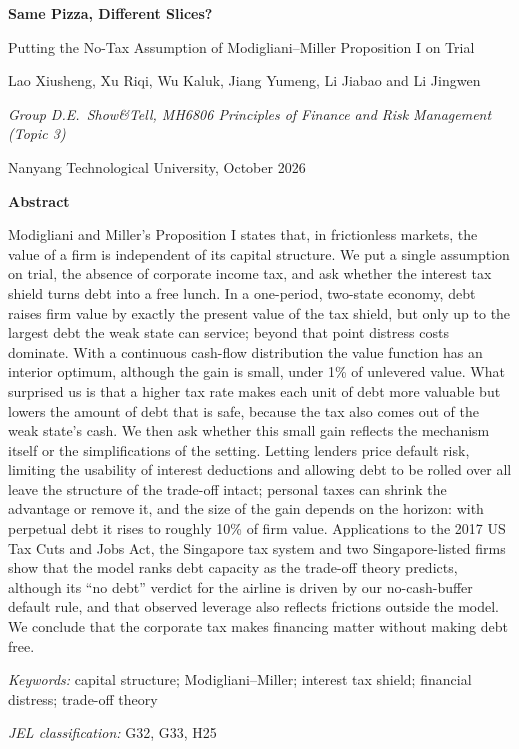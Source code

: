 \begin{center}
{\LARGE\bfseries Same Pizza, Different Slices?\par}
\vspace{4pt}
{\large Putting the No-Tax Assumption of Modigliani--Miller Proposition I on Trial\par}
\vspace{10pt}
{\normalsize Lao Xiusheng, Xu Riqi, Wu Kaluk, Jiang Yumeng, Li Jiabao and Li Jingwen\par}
\vspace{2pt}
{\small\itshape Group D.E.\ Show\&Tell, MH6806 Principles of Finance and Risk Management (Topic 3)\par
Nanyang Technological University, October 2026\par}
\end{center}
\vspace{4pt}
\begin{center}\textbf{Abstract}\end{center}
\vspace{-6pt}
\begin{list}{}{\leftmargin=1cm\rightmargin=1cm\itemindent=0pt\listparindent=0pt\topsep=0pt\parsep=0pt}\item[]\small
Modigliani and Miller's Proposition I states that, in frictionless markets, the value of a firm is independent of its capital structure. We put a single assumption on trial, the absence of corporate income tax, and ask whether the interest tax shield turns debt into a free lunch. In a one-period, two-state economy, debt raises firm value by exactly the present value of the tax shield, but only up to the largest debt the weak state can service; beyond that point distress costs dominate. With a continuous cash-flow distribution the value function has an interior optimum, although the gain is small, under 1\% of unlevered value. What surprised us is that a higher tax rate makes each unit of debt more valuable but lowers the amount of debt that is safe, because the tax also comes out of the weak state's cash. We then ask whether this small gain reflects the mechanism itself or the simplifications of the setting. Letting lenders price default risk, limiting the usability of interest deductions and allowing debt to be rolled over all leave the structure of the trade-off intact; personal taxes can shrink the advantage or remove it, and the size of the gain depends on the horizon: with perpetual debt it rises to roughly 10\% of firm value. Applications to the 2017 US Tax Cuts and Jobs Act, the Singapore tax system and two Singapore-listed firms show that the model ranks debt capacity as the trade-off theory predicts, although its ``no debt'' verdict for the airline is driven by our no-cash-buffer default rule, and that observed leverage also reflects frictions outside the model. We conclude that the corporate tax makes financing matter without making debt free.\par
\smallskip
\textit{Keywords:} capital structure; Modigliani--Miller; interest tax shield; financial distress; trade-off theory\par
\textit{JEL classification:} G32, G33, H25
\end{list}
\vspace{6pt}
